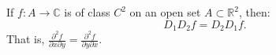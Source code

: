 If $f: A \to \mathbb{C}$ is of class $C^2$ on an open set $A \subset \mathbb{R}^2$, then:
\[
D_1 D_2 f = D_2 D_1 f.
\]
That is, $\frac{\partial^2 f}{\partial x \partial y} = \frac{\partial^2 f}{\partial y \partial x}$.
